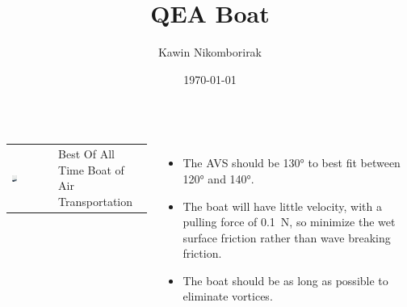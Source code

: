 \documentclass[17pt, a2paper, landscape]{tikzposter}
\title{QEA Boat}
\author{Kawin Nikomborirak}
\date{\today}
\begin{document}
\maketitle

\begin{columns}

  {
    \begin{tabularx}{0.4\textwidth}{l X}
    \includegraphics[width=0.15\textwidth]{FinishedBoat.jpg} &
    {Best Of All Time \newline Boat of Air Transportation}
    \end{tabularx}
  }

  {
    \begin{itemize}
    \item The AVS should be \ang{130} to best fit between \ang{120} and \ang{140}.
    \item The boat will have little velocity, with a pulling force of \SI{.1}{\N}, so minimize the wet surface friction rather than wave breaking friction.
    \item The boat should be as long as possible to eliminate vortices.
    \end{itemize}
  }




\end{columns}
\end{document}
